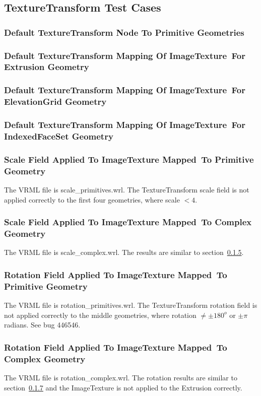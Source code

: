 \documentclass[12pt,letterpaper]{article}
\newcommand{\TTA}{Default TextureTransform Node To Primitive Geometries}
\newcommand{\TTBa}{Default TextureTransform Mapping Of ImageTexture~}
\newcommand{\TTBb}{For Extrusion Geometry}
\newcommand{\TTCa}{Default TextureTransform Mapping Of ImageTexture~}
\newcommand{\TTCb}{For ElevationGrid Geometry}
\newcommand{\TTDa}{Default TextureTransform Mapping Of ImageTexture~}
\newcommand{\TTDb}{For IndexedFaceSet Geometry}
\newcommand{\TTEa}{Scale Field Applied To ImageTexture Mapped~}
\newcommand{\TTEb}{To Primitive Geometry}
\newcommand{\TTFa}{Scale Field Applied To ImageTexture Mapped~}
\newcommand{\TTFb}{To Complex Geometry}
\newcommand{\TTGa}{Rotation Field Applied To ImageTexture Mapped~}
\newcommand{\TTGb}{To Primitive Geometry}
\newcommand{\TTHa}{Rotation Field Applied To ImageTexture Mapped~}
\newcommand{\TTHb}{To Complex Geometry}
\begin{document}
\subsection{TextureTransform Test Cases}

\subsubsection{\TTA}
\subsubsection{\TTBa\TTBb}
\subsubsection{\TTCa\TTCb}
\subsubsection{\TTDa\TTDb}
\subsubsection{\TTEa\TTEb}
\label{sec:scale}
The VRML file is scale\_primitives.wrl.\newline
The TextureTransform scale field is not applied correctly to
the first four geometries, where scale $< 4$.

\subsubsection{\TTFa\TTFb}
The VRML file is scale\_complex.wrl.\newline
The results are similar to section~\ref{sec:scale}.

\subsubsection{\TTGa\TTGb}
\label{sec:rotation}
The VRML file is rotation\_primitives.wrl.\newline
The TextureTransform rotation field is not applied correctly
to the middle geometries, where rotation $\neq \pm 180^o$ or
$\pm \pi$ radians.
See bug 446546.

\subsubsection{\TTHa\TTHb}
The VRML file is rotation\_complex.wrl.\newline
The rotation results are similar to section~\ref{sec:rotation} and
the ImageTexture is not applied to the Extrusion correctly.
\end{document}
